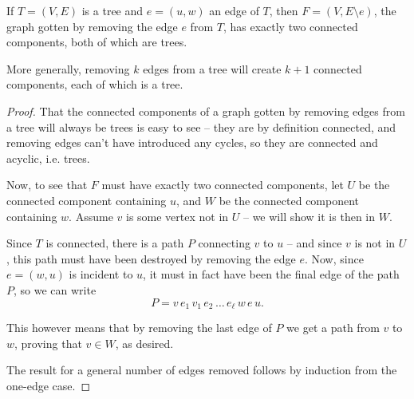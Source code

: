 \documentclass[nobib]{tufte-handout}
\begin{document}
\begin{lemma} \label{lemma:removing_edges_from_trees}
  If $T = (V, E)$ is a tree and $e = (u, w)$ an edge of $T$, then $F = (V, E \setminus e)$, the graph gotten by removing the edge $e$ from $T$, has exactly two connected components, both of which are trees.

  More generally, removing $k$ edges from a tree will create $k+1$ connected components, each of which is a tree.
  
  \begin{proof}
    That the connected components of a graph gotten by removing edges from a tree will always be trees is easy to see -- they are by definition connected, and removing edges can't have introduced any cycles, so they are connected and acyclic, i.e. trees.

    Now, to see that $F$ must have exactly two connected components, let $U$ be the connected component containing $u$, and $W$ be the connected component containing $w$. Assume $v$ is some vertex not in $U$ -- we will show it is then in $W$.

    Since $T$ is connected, there is a path $P$ connecting $v$ to $u$ -- and since $v$ is not in $U$, this path must have been destroyed by removing the edge $e$. Now, since $e = (w, u)$ is incident to $u$, it must in fact have been the final edge of the path $P$, so we can write
    $$P = v\, e_1\, v_1\, e_2\, \ldots\, e_\ell\, w\, e\, u.$$
    
    This however means that by removing the last edge of $P$ we get a path from $v$ to $w$, proving that $v \in W$, as desired.

    The result for a general number of edges removed follows by induction from the one-edge case.
  \end{proof}
\end{lemma}
\end{document}

